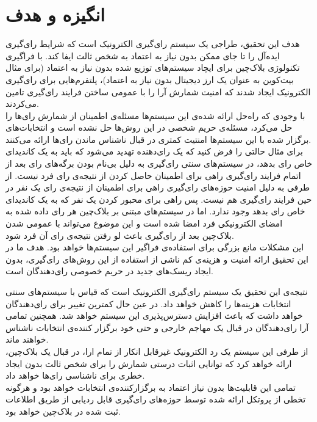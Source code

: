 \section{انگیزه و هدف}
هدف این تحقیق، طراجی یک سیستم رای‌گیری الکترونیک است که شرایط رای‌گیری ایده‌آل را تا جای ممکن بدون نیاز به اعتماد به شخص ثالث ایفا کند. با فراگیری تکنولوژی بلاک‌چین برای ایچاد سیستم‌های توزیع شده بدون نیاز به اعتماد (برای مثال بیت‌کوین به عنوان یک‌ ارز دیجیتال بدون نیاز به اعتماد)، پلتفرم‌هایی برای رای‌گیری الکترونیک ایجاد شدند که امنیت شمارش آرا را با عمومی ساختن فرایند رای‌گیری تامین می‌کردند. 
\\
با وجودی که راه‌حل ارائه شده‌ی این سیستم‌ها مسئله‌ی اطمینان از شمارش رای‌ها را حل می‌کرد، مسئله‌ی حریم شخصی در این روش‌ها حل نشده است و انتخابات‌های برگزار شده با این سیستم‌ها امنتیت کمتری در قبال ناشناس ماندن رای‌ها ارائه می‌کنند. 
\\
برای مثال حالتی را فرض کنید که یک رای‌دهنده تهدید می‌شود که باید به یک کاندیدای خاص رای بدهد، در سیستم‌های سنتی رای‌گیری به دلیل بی‌نام بودن برگه‌های رای بعد از اتمام فرایند رای‌گیری راهی برای اطمینان حاصل کردن از نتیجه‌ی رای فرد نیست. از طرفی به دلیل امنیت حوزه‌های رای‌گیری راهی برای اطمینان از نتیجه‌ی رای یک نفر در حین فرایند رای‌گیری هم نیست. پس راهی برای محبور کردن یک نفر که به یک کاندیدای خاص رای بدهد وجود ندارد. اما در سیستم‌های مبتنی بر بلاک‌چین هر رای داده شده به امضای الکترونیکی فرد امضا شده است و این موضوع می‌تواند با عمومی شدن بلاک‌چین بعد از رای‌گیری باعث لو رفتن نتیجه‌ی رای آن فرد شود.
\\
این مشکلات مانع بزرگی برای استفاده‌ی فراگیر این سیستم‌ها خواهد بود. هدف ما در این تحقیق ارائه امنیت و هزینه‌ی کم ناشی از استفاده از این روش‌های رای‌گیری، بدون ایجاد ریسک‌های جدید در حریم خصوصی رای‌دهندگان است. 
\par
نتیجه‌ی این تحقیق یک سیستم‌ رای‌گیری الکترونیک است که قیاس با سیستم‌های سنتی انتخابات هزینه‌ها را کاهش خواهد داد. در عین حال کمترین تغییر برای رای‌دهندگان خواهد داشت که باعث افزایش دسترس‌پذیری این سیستم خواهد شد. همچنین تمامی آرا رای‌دهندگان در قبال یک مهاجم خارجی و حتی خود برگزار کننده‌ی انتخابات ناشناس خواهند ماند. 
\\
از طرفی این سیستم یک رد الکترونیک غیرقابل انکار از تمام ارا، در قبال یک بلاک‌چین، ارائه ‌خواهد کرد که توانایی اثبات درستی شمارش را برای شخص ثالث بدون ایجاد خطری برای ناشناسی رای‌ها خواهد داد. 
\\
تمامی این قابلیت‌ها بدون نیاز اعتماد به برگزارکننده‌ی انتخابات خواهد بود و هرگونه تخطی از پروتکل ارائه شده توسط حوزه‌های رای‌گیری قابل ردیابی از طریق اطلاعات ثبت شده در بلاک‌چین خواهد بود.








